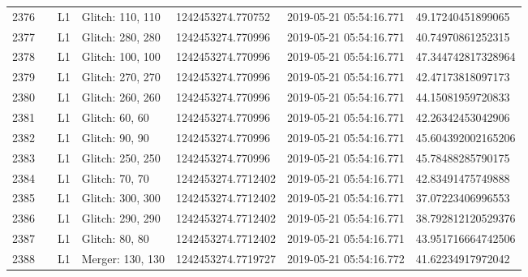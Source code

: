 \begin{longtable}{lllllll}
2376 &                                                    &       L1 &  Glitch: 110, 110 &   1242453274.770752 &  2019-05-21 05:54:16.771 &   49.17240451899065 \\
2377 &                                                    &       L1 &  Glitch: 280, 280 &   1242453274.770996 &  2019-05-21 05:54:16.771 &   40.74970861252315 \\
2378 &                                                    &       L1 &  Glitch: 100, 100 &   1242453274.770996 &  2019-05-21 05:54:16.771 &  47.344742817328964 \\
2379 &                                                    &       L1 &  Glitch: 270, 270 &   1242453274.770996 &  2019-05-21 05:54:16.771 &   42.47173818097173 \\
2380 &                                                    &       L1 &  Glitch: 260, 260 &   1242453274.770996 &  2019-05-21 05:54:16.771 &   44.15081959720833 \\
2381 &                                                    &       L1 &    Glitch: 60, 60 &   1242453274.770996 &  2019-05-21 05:54:16.771 &   42.26342453042906 \\
2382 &                                                    &       L1 &    Glitch: 90, 90 &   1242453274.770996 &  2019-05-21 05:54:16.771 &  45.604392002165206 \\
2383 &                                                    &       L1 &  Glitch: 250, 250 &   1242453274.770996 &  2019-05-21 05:54:16.771 &   45.78488285790175 \\
2384 &                                                    &       L1 &    Glitch: 70, 70 &  1242453274.7712402 &  2019-05-21 05:54:16.771 &   42.83491475749888 \\
2385 &                                                    &       L1 &  Glitch: 300, 300 &  1242453274.7712402 &  2019-05-21 05:54:16.771 &   37.07223406996553 \\
2386 &                                                    &       L1 &  Glitch: 290, 290 &  1242453274.7712402 &  2019-05-21 05:54:16.771 &  38.792812120529376 \\
2387 &                                                    &       L1 &    Glitch: 80, 80 &  1242453274.7712402 &  2019-05-21 05:54:16.771 &  43.951716664742506 \\
2388 &                                                    &       L1 &  Merger: 130, 130 &  1242453274.7719727 &  2019-05-21 05:54:16.772 &   41.62234917972042 \\

\end{longtable}
